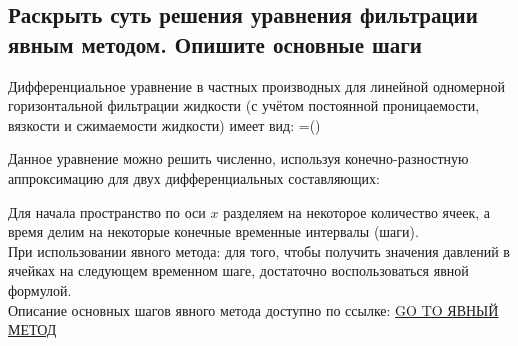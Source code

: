 

\subsection{Раскрыть суть решения уравнения фильтрации явным методом. Опишите основные шаги}

Дифференциальное уравнение в частных производных для линейной одномерной горизонтальной фильтрации жидкости (с учётом постоянной проницаемости, вязкости и сжимаемости жидкости) имеет вид:
\beq
{}=\left(\right)
\eeq

Данное уравнение можно решить численно, используя конечно-разностную аппроксимацию для двух дифференциальных составляющих:
\beq
{}
\eeq

Для начала пространство по оси $x$ разделяем на некоторое количество ячеек, а время делим на некоторые конечные временные интервалы (шаги).
\\

При использовании явного метода: для того, чтобы получить значения давлений в ячейках на следующем временном шаге, достаточно воспользоваться явной формулой.
\\


Описание основных шагов явного метода доступно по ссылке: \href{https://docs.yandex.ru/docs/view?url=ya-disk-public\%3A\%2F\%2FWicxck3PRHBvGgXBKaNry\%2FRtiluR1m6cR6Bi14xdyyNQDBM0D9VXsHr3EpLffWemDqZvSgIch5AN9ddz7ydViQ\%3D\%3D\%3A\%2F\%D0\%92\%D1\%82\%D0\%BE\%D1\%80\%D0\%BE\%D0\%B9\%20\%D0\%BA\%D1\%83\%D1\%80\%D1\%81\%20\%D0\%BC\%D0\%B0\%D0\%B3\%D0\%B8\%D1\%81\%D1\%82\%D1\%80\%D0\%B0\%D1\%82\%D1\%83\%D1\%80\%D1\%8B\%2F\%D0\%93\%D0\%B8\%D0\%B4\%D1\%80\%D0\%BE\%D0\%B4\%D0\%B8\%D0\%BD\%D0\%B0\%D0\%BC\%D0\%B8\%D1\%87\%D0\%B5\%D1\%81\%D0\%BA\%D0\%BE\%D0\%B5\%20\%D0\%BC\%D0\%BE\%D0\%B4\%D0\%B5\%D0\%BB\%D0\%B8\%D1\%80\%D0\%BE\%D0\%B2\%D0\%B0\%D0\%BD\%D0\%B8\%D0\%B5\%2FExplicit\%20Numerical\%20Solution\%20of\%20One-Dimensional\%20Filtration\%20in\%20a\%20Reservoir.pdf&name=Explicit\%20Numerical\%20Solution\%20of\%20One-Dimensional\%20Filtration\%20in\%20a\%20Reservoir.pdf&nosw=1}{GO TO ЯВНЫЙ МЕТОД}

